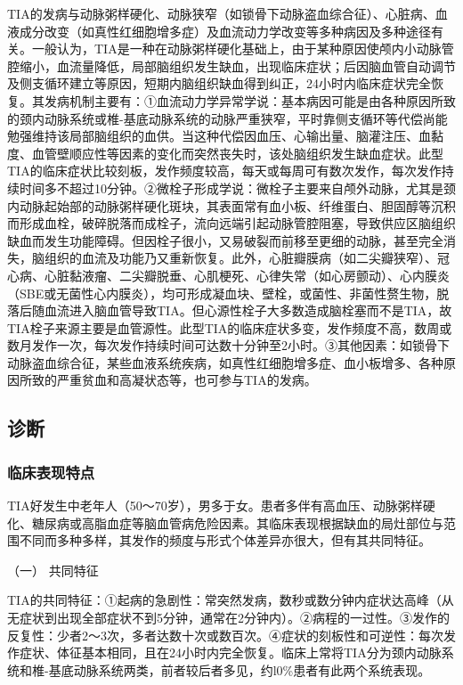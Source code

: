 TIA的发病与动脉粥样硬化、动脉狭窄（如锁骨下动脉盗血综合征）、心脏病、血液成分改变（如真性红细胞增多症）及血流动力学改变等多种病因及多种途径有关。一般认为，TIA是一种在动脉粥样硬化基础上，由于某种原因使颅内小动脉管腔缩小，血流量降低，局部脑组织发生缺血，出现临床症状；后因脑血管自动调节及侧支循环建立等原因，短期内脑组织缺血得到纠正，24小时内临床症状完全恢复。其发病机制主要有：①血流动力学异常学说：基本病因可能是由各种原因所致的颈内动脉系统或椎-基底动脉系统的动脉严重狭窄，平时靠侧支循环等代偿尚能勉强维持该局部脑组织的血供。当这种代偿因血压、心输出量、脑灌注压、血黏度、血管壁顺应性等因素的变化而突然丧失时，该处脑组织发生缺血症状。此型TIA的临床症状比较刻板，发作频度较高，每天或每周可有数次发作，每次发作持续时间多不超过10分钟。②微栓子形成学说：微栓子主要来自颅外动脉，尤其是颈内动脉起始部的动脉粥样硬化斑块，其表面常有血小板、纤维蛋白、胆固醇等沉积而形成血栓，破碎脱落而成栓子，流向远端引起动脉管腔阻塞，导致供应区脑组织缺血而发生功能障碍。但因栓子很小，又易破裂而前移至更细的动脉，甚至完全消失，脑组织的血流及功能乃又重新恢复。此外，心脏瓣膜病（如二尖瓣狭窄）、冠心病、心脏黏液瘤、二尖瓣脱垂、心肌梗死、心律失常（如心房颤动）、心内膜炎（SBE或无菌性心内膜炎），均可形成凝血块、壁栓，或菌性、非菌性赘生物，脱落后随血流进入脑血管导致TIA。但心源性栓子大多数造成脑栓塞而不是TIA，故TIA栓子来源主要是血管源性。此型TIA的临床症状多变，发作频度不高，数周或数月发作一次，每次发作持续时间可达数十分钟至2小时。③其他因素：如锁骨下动脉盗血综合征，某些血液系统疾病，如真性红细胞增多症、血小板增多、各种原因所致的严重贫血和高凝状态等，也可参与TIA的发病。

\subsection{诊断}

\subsubsection{临床表现特点}

TIA好发生中老年人（50～70岁），男多于女。患者多伴有高血压、动脉粥样硬化、糖尿病或高脂血症等脑血管病危险因素。其临床表现根据缺血的局灶部位与范围不同而多种多样，其发作的频度与形式个体差异亦很大，但有其共同特征。

\hypertarget{text00241.htmlux5cux23CHP8-1-1-2-1-1}{}
（一） 共同特征

TIA的共同特征：①起病的急剧性：常突然发病，数秒或数分钟内症状达高峰（从无症状到出现全部症状不到5分钟，通常在2分钟内）。②病程的一过性。③发作的反复性：少者2～3次，多者达数十次或数百次。④症状的刻板性和可逆性：每次发作症状、体征基本相同，且在24小时内完全恢复。临床上常将TIA分为颈内动脉系统和椎-基底动脉系统两类，前者较后者多见，约l0\%患者有此两个系统表现。

